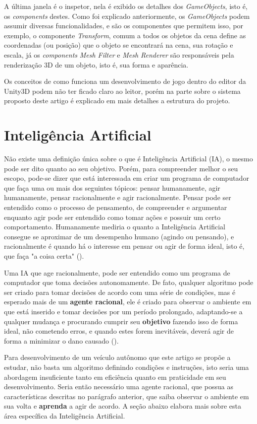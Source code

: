 A última janela é o inspetor, nela é exibido os detalhes dos \textit{GameObjects}, isto é, os \textit{components} destes. Como foi explicado anteriormente, os \textit{GameObjects} podem assumir diversas funcionalidades, e são os componentes que permitem isso, por exemplo, o componente \textit{Transform}, comum a todos os objetos da cena define as coordenadas (ou posição) que o objeto se encontrará na cena, sua rotação e escala, já os \textit{components} \textit{Mesh Filter} e \textit{Mesh Renderer} são responsáveis pela renderização 3D de um objeto, isto é, sua forma e aparência.

Os conceitos de como funciona um desenvolvimento de jogo dentro do editor da Unity3D podem não ter ficado claro ao leitor, porém na parte sobre o sistema proposto deste artigo é explicado em mais detalhes a estrutura do projeto.

\section{Inteligência Artificial}
Não existe uma definição única sobre o que é Inteligência Artificial (IA), o mesmo pode ser dito quanto ao seu objetivo. Porém, para compreender melhor o seu escopo, pode-se dizer que está interessada em criar um programa de computador que faça uma ou mais dos seguintes tópicos: pensar humanamente, agir humanamente, pensar racionalmente e agir racionalmente. Pensar pode ser entendido como o processo de pensamento, de compreender e argumentar enquanto agir pode ser entendido como tomar ações e possuir um certo comportamento. Humanamente mediria o quanto a Inteligência Artificial consegue se aproximar de um desempenho humano (agindo ou pensando), e racionalmente é quando há o interesse em pensar ou agir de forma ideal, isto é, que faça "a coisa certa" ().

Uma IA que age racionalmente, pode ser entendido como um programa de computador que toma decisões autonomamente. De fato, qualquer algoritmo pode ser criado para tomar decisões de acordo com uma série de condições, mas é esperado mais de um \textbf{agente racional}, ele é criado para observar o ambiente em que está inserido e tomar decisões por um período prolongado, adaptando-se a qualquer mudança e procurando cumprir seu \textbf{objetivo} fazendo isso de forma ideal, não cometendo erros, e quando estes forem inevitáveis, deverá agir de forma a minimizar o dano causado ().

Para desenvolvimento de um veículo autônomo que este artigo se propõe a estudar, não basta um algoritmo definindo condições e instruções, isto seria uma abordagem insuficiente tanto em eficiência quanto em praticidade em seu desenvolvimento. Seria então necessário uma agente racional, que possua as características descritas no parágrafo anterior, que saiba observar o ambiente em sua volta e \textbf{aprenda} a agir de acordo. A seção abaixo elabora mais sobre esta área específica da Inteligência Artificial.


